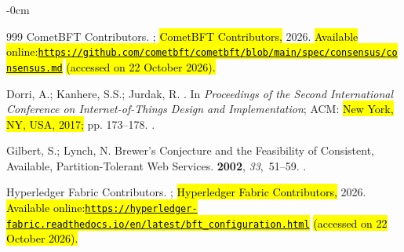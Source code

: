 \documentclass[blockchains,review,accept,moreauthors]{Definitions/mdpi}
\begin{document}
\begin{adjustwidth}{-\extralength}{0cm}
\begin{thebibliography}{999}
{CometBFT Contributors}.
; \hl{CometBFT Contributors,}  2026.
\newblock \hl{Available online:}\space \href{https://github.com/cometbft/cometbft/blob/main/spec/consensus/consensus.md}{\hl{\mbox{\nolinkurl{https://github.com/}}}}\allowbreak\href{https://github.com/cometbft/cometbft/blob/main/spec/consensus/consensus.md}{\hl{\mbox{\nolinkurl{cometbft/}}}}\allowbreak\href{https://github.com/cometbft/cometbft/blob/main/spec/consensus/consensus.md}{\hl{\mbox{\nolinkurl{cometbft/}}}}\allowbreak\href{https://github.com/cometbft/cometbft/blob/main/spec/consensus/consensus.md}{\hl{\mbox{\nolinkurl{blob/}}}}\allowbreak\href{https://github.com/cometbft/cometbft/blob/main/spec/consensus/consensus.md}{\hl{\mbox{\nolinkurl{main/}}}}\allowbreak\href{https://github.com/cometbft/cometbft/blob/main/spec/consensus/consensus.md}{\hl{\mbox{\nolinkurl{spec/}}}}\allowbreak\href{https://github.com/cometbft/cometbft/blob/main/spec/consensus/consensus.md}{\hl{\mbox{\nolinkurl{consensus/}}}}\allowbreak\href{https://github.com/cometbft/cometbft/blob/main/spec/consensus/consensus.md}{\hl{\mbox{\nolinkurl{consensus.md}}}} \space\hl{(accessed on 22 October 2026).}

Dorri, A.; Kanhere, S.S.; Jurdak, R.
.
\newblock In \emph{Proceedings of the Second International Conference on
  Internet-of-Things Design and Implementation}; ACM: \hl{New York, NY, USA, 2017;} pp. 173--178.
.

Gilbert, S.; Lynch, N.
\newblock Brewer's Conjecture and the Feasibility of Consistent, Available,
  Partition-Tolerant Web Services.
 {\bf 2002}, {\em 33},~51--59.
.

{Hyperledger Fabric Contributors}.
; \hl{Hyperledger Fabric Contributors,} 2026.
\newblock \hl{Available online:}\space \href{https://hyperledger-fabric.readthedocs.io/en/latest/bft_configuration.html}{\hl{\mbox{\nolinkurl{https://hyperledger-fabric.readthedocs.io/}}}}\allowbreak\href{https://hyperledger-fabric.readthedocs.io/en/latest/bft_configuration.html}{\hl{\mbox{\nolinkurl{en/}}}}\allowbreak\href{https://hyperledger-fabric.readthedocs.io/en/latest/bft_configuration.html}{\hl{\mbox{\nolinkurl{latest/}}}}\allowbreak\href{https://hyperledger-fabric.readthedocs.io/en/latest/bft_configuration.html}{\hl{\mbox{\nolinkurl{bft_configuration.html}}}} \space\hl{(accessed on 22 October 2026).}


\end{thebibliography}
\end{adjustwidth}
\end{document}
